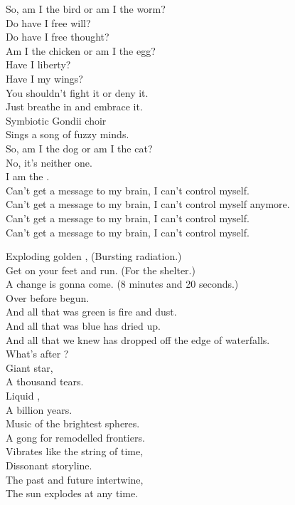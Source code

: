 So, am I the bird or am I the worm? \\
Do have I free will? \\
Do have I free thought? \\
Am I the chicken or am I the egg? \\
Have I liberty? \\
Have I my wings? \\
You shouldn't fight it or deny it. \\
Just breathe in and embrace it. \\
Symbiotic Gondii choir \\
Sings a song of fuzzy minds. \\
So, am I the dog or am I the cat? \\
No, it's neither one. \\
I am the . \\

Can't get a message to my brain, I can't control myself. \\
Can't get a message to my brain, I can't control myself anymore. \\
Can't get a message to my brain, I can't control myself. \\
Can't get a message to my brain, I can't control myself. \\





Exploding golden , (Bursting radiation.) \\
Get on your feet and run. (For the shelter.) \\
A change is gonna come. (8 minutes and 20 seconds.) \\
Over before begun. \\

And all that was green is fire and dust. \\
And all that was blue has dried up. \\
And all that we knew has dropped off the edge of waterfalls. \\
What's after ? \\

Giant star, \\
A thousand tears. \\
Liquid , \\
A billion years. \\
Music of the brightest spheres. \\
A gong for remodelled frontiers. \\
Vibrates like the string of time, \\
Dissonant storyline. \\
The past and future intertwine, \\
The sun explodes at any time. \\

